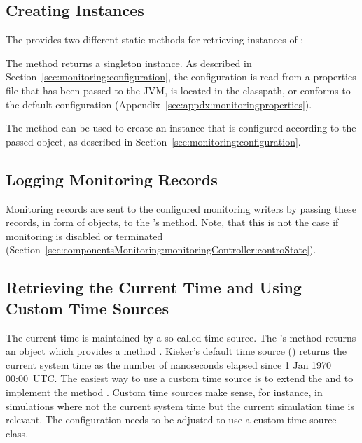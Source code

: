\subsection{Creating  Instances}\label{sec:componentsMonitoring:monitoringController:factory}

The  provides two different static methods for retrieving instances of %
:\\

\begin{compactenum}
 \item The method  returns a singleton instance. %
As described in Section~\ref{sec:monitoring:configuration}, the configuration is read from %
a properties file that has been passed to the JVM, is located in the classpath, or %
conforms to the default configuration (Appendix~\ref{sec:appdx:monitoringproperties}). %
 \item The method  can be used to create %
an instance that is configured according to the passed  object, %
as described in Section~\ref{sec:monitoring:configuration}.
\end{compactenum}

\subsection{Logging Monitoring Records}\label{sec:componentsMonitoring:monitoringController:logging}

Monitoring records are sent to the configured monitoring writers by passing %
these records, in form of  objects, to the %
's  method.  %
Note, that this is not the case if monitoring is disabled or terminated (Section~\ref{sec:componentsMonitoring:monitoringController:controState}). 

\subsection{Retrieving the Current Time and Using Custom Time Sources}\label{sec:componentsMonitoring:monitoringController:getTime}

The current time is maintained by a so-called time source. The 's method %
 returns an  object which provides a method %
. Kieker's default time source () returns the current system %
time as the number of nanoseconds elapsed since 1 Jan 1970 00:00~UTC. %
The easiest way to use a custom time source is to extend the  and %
to implement the method . Custom time sources make sense, for instance, %
in simulations where not the current system time but the current simulation time is %
relevant. The configuration needs to be adjusted to use a custom time source class. %

